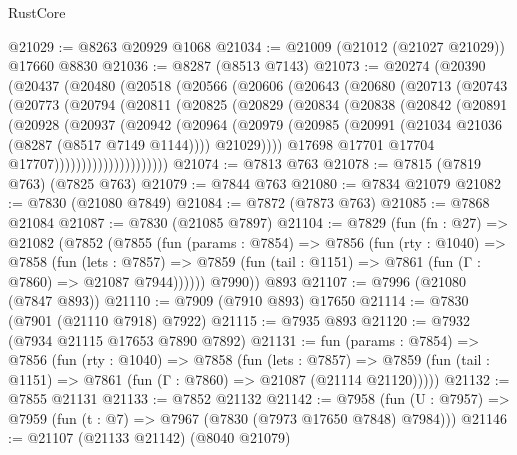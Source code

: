 \begin{lexlean}{RustCore}
\begin{coremodule}
@21029 := @8263 @20929 @1068
@21034 := @21009 (@21012 (@21027 @21029)) @17660 @8830
@21036 := @8287 (@8513 @7143)
@21073 := @20274
    (@20390
      (@20437
        (@20480
          (@20518
            (@20566
              (@20606
                (@20643
                  (@20680
                    (@20713
                      (@20743
                        (@20773
                          (@20794
                            (@20811
                              (@20825
                                (@20829
                                  (@20834
                                    (@20838
                                      (@20842
                                        (@20891
                                          (@20928
                                            (@20937
                                              (@20942
                                                (@20964
                                                  (@20979
                                                    (@20985
                                                      (@20991
                                                        (@21034 @21036 (@8287 (@8517 @7149 @1144))))
                                                      @21029))))
                                              @17698
                                              @17701
                                              @17704
                                              @17707)))))))))))))))))))))
@21074 := @7813 @763
@21078 := @7815 (@7819 @763) (@7825 @763)
@21079 := @7844 @763
@21080 := @7834 @21079
@21082 := @7830 (@21080 @7849)
@21084 := @7872 (@7873 @763)
@21085 := @7868 @21084
@21087 := @7830 (@21085 @7897)
@21104 := @7829
    (fun (fn : @27) =>
    @21082
      (@7852
        (@7855
          (fun (params : @7854) =>
          @7856
            (fun (rty : @1040) =>
            @7858
              (fun (lets : @7857) =>
              @7859 (fun (tail : @1151) => @7861 (fun (Γ : @7860) => @21087 @7944))))))
        @7990))
    @893
@21107 := @7996 (@21080 (@7847 @893))
@21110 := @7909 (@7910 @893) @17650
@21114 := @7830 (@7901 (@21110 @7918) @7922)
@21115 := @7935 @893
@21120 := @7932 (@7934 @21115 @17653 @7890 @7892)
@21131 := fun (params : @7854) =>
  @7856
    (fun (rty : @1040) =>
    @7858
      (fun (lets : @7857) =>
      @7859 (fun (tail : @1151) => @7861 (fun (Γ : @7860) => @21087 (@21114 @21120)))))
@21132 := @7855 @21131
@21133 := @7852 @21132
@21142 := @7958
    (fun (U : @7957) => @7959 (fun (t : @7) => @7967 (@7830 (@7973 @17650 @7848) @7984)))
@21146 := @21107 (@21133 @21142) (@8040 @21079)

\end{coremodule}
\end{lexlean}
